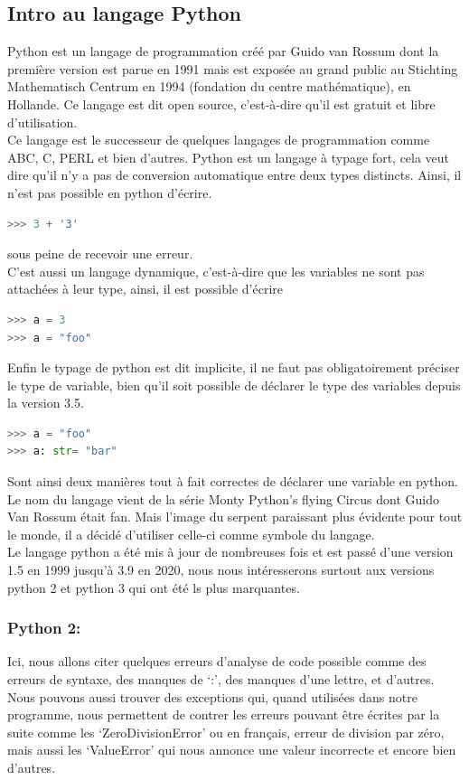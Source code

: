 \documentclass[a4paper, 12pt]{article}
\numberwithin{equation}{subsection}
\begin{document}
\subsection{Intro au langage Python}
Python est un langage de programmation créé par Guido van Rossum dont la première version est parue en 1991 mais est exposée au grand public au Stichting Mathematisch Centrum en 1994 (fondation du centre mathématique), en Hollande. Ce langage est dit open source, c'est-à-dire qu’il est gratuit et libre d’utilisation.\\

Ce langage est le successeur de quelques langages de programmation comme ABC,  C, PERL et bien d’autres. Python est un langage à typage fort, cela veut dire qu’il n’y a pas de conversion automatique entre deux types distincts. Ainsi, il n’est pas possible en python d’écrire.\\
\begin{lstlisting}[language=Python]
>>> 3 + '3'
\end{lstlisting}
sous peine de recevoir une erreur.\\

C’est aussi un langage dynamique, c’est-à-dire que les variables ne sont pas attachées à leur type, ainsi, il est possible d’écrire \\
\begin{lstlisting}[language=Python]
>>> a = 3
>>> a = "foo"
\end{lstlisting}
Enfin le typage de python est dit implicite, il ne faut pas obligatoirement préciser le type de variable, bien qu’il soit possible de déclarer le type des variables depuis la version 3.5.\\
\begin{lstlisting}[language=Python]
>>> a = "foo"
>>> a: str= "bar"
\end{lstlisting}
Sont ainsi deux manières tout à fait correctes de déclarer une variable en python.\\

Le nom du langage vient de la série Monty Python’s flying Circus dont Guido Van Rossum était fan. Mais l’image du serpent paraissant plus évidente pour tout le monde, il a décidé d'utiliser celle-ci comme symbole du langage.\\

Le langage python a été mis à jour de nombreuses fois et est passé d’une version 1.5 en 1999 jusqu’à 3.9 en 2020, nous nous intéresserons surtout aux versions python 2 et python 3 qui ont été ls plus marquantes.
\subsubsection{Python 2:}
Ici, nous allons citer quelques erreurs d’analyse de code possible comme des erreurs de syntaxe, des manques de ‘:’, des manques d’une lettre, et d'autres. Nous pouvons aussi trouver des exceptions qui, quand utilisées dans notre programme, nous permettent de contrer les erreurs pouvant être écrites par la suite comme les ‘ZeroDivisionError’ ou en français, erreur de division par zéro, mais aussi les ‘ValueError’ qui nous annonce une valeur incorrecte et encore bien d’autres.\\
\end{document}
